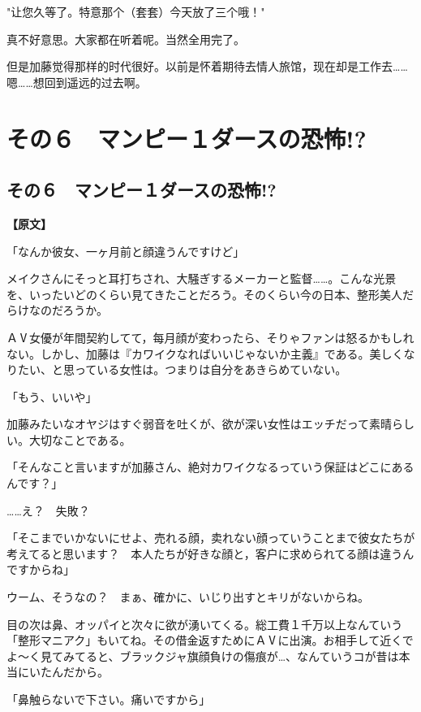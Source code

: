 \documentclass[12pt,UTF8]{ctexbook}
\begin{document}
{{"让您久等了。特意那个（套套）今天放了三个哦！"

真不好意思。大家都在听着呢。当然全用完了。

但是加藤觉得那样的时代很好。以前是怀着期待去情人旅馆，现在却是工作去……嗯……想回到遥远的过去啊。
}

\chapter{その６　マンピー１ダースの恐怖!?}
\label{chap:06}

\section{その６　マンピー１ダースの恐怖!?}

\vspace{1ex}
\parbox{0.9\linewidth}{
\textbf{【原文】}\par

「なんか彼女、一ヶ月前と顔違うんですけど」

メイクさんにそっと耳打ちされ、大騒ぎするメーカーと監督……。こんな光景を、いったいどのくらい見てきたことだろう。そのくらい今の日本、整形美人だらけなのだろうか。

ＡⅤ女優が年間契約してて，每月顔が変わったら、そりゃファンは怒るかもしれない。しかし、加藤は『カワイクなればいいじゃないか主義』である。美しくなりたい、と思っている女性は。つまりは自分をあきらめていない。

「もう、いいや」

加藤みたいなオヤジはすぐ弱音を吐くが、欲が深い女性はエッチだって素晴らしい。大切なことである。

「そんなこと言いますが加藤さん、絶対カワイクなるっていう保証はどこにあるんです？」

……え？　失敗？

「そこまでいかないにせよ、売れる顔，卖れない顔っていうことまで彼女たちが考えてると思います？　本人たちが好きな顔と，客户に求められてる顔は違うんですからね」

ウーム、そうなの？　まぁ、確かに、いじり出すとキリがないからね。

目の次は鼻、オッパイと次々に欲が湧いてくる。総工費１千万以上なんていう「整形マニアク」もいてね。その借金返すためにＡⅤに出演。お相手して近くでよ～く見てみてると、ブラックジャ旗顔負けの傷痕が…、なんていうコが昔は本当にいたんだから。

「鼻触らないで下さい。痛いですから」

}}
\end{document}
